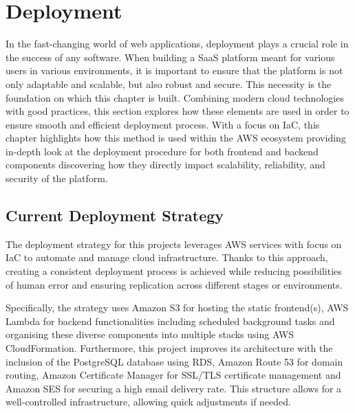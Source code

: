 \chapter{Deployment}
\label{chap:deployment}
In the fast-changing world of web applications, deployment plays a crucial role in the success of any software.
When building a \ac{SaaS} platform meant for various users in various environments, it is important to ensure that the platform is not only adaptable and scalable, but also robust and secure.
This necessity is the foundation on which this chapter is built.
Combining modern cloud technologies with good practices, this section explores how these elements are used in order to ensure smooth and efficient deployment process.
With a focus on \ac{IaC}, this chapter highlights how this method is used within the \ac{AWS} ecosystem providing in-depth look at the deployment procedure for both frontend and backend components discovering how they directly impact scalability, reliability, and security of the platform.

\section{Current Deployment Strategy}
\label{sec:current-deployment-strategy}

The deployment strategy for this projects leverages \ac{AWS} services with focus on \ac{IaC} to automate and manage cloud infrastructure.
Thanks to this approach, creating a consistent deployment process is achieved while reducing possibilities of human error and ensuring replication across different stages or environments.

Specifically, the strategy uses Amazon \ac{S3} for hosting the static frontend(s), \ac{AWS} Lambda for backend functionalities including scheduled background tasks and organising these diverse components into multiple stacks using \ac{AWS} CloudFormation.
Furthermore, this project improves its architecture with the inclusion of the PostgreSQL database using \ac{RDS}, Amazon Route 53 for domain routing, Amazon Certificate Manager for SSL/TLS certificate management and Amazon \ac{SES} for securing a high email delivery rate.
This structure allows for a well-controlled infrastructure, allowing quick adjustments if needed.

